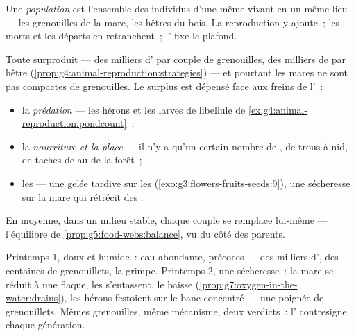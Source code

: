\begin{definition}[Population]\label{def:g8:reproduction-and-environment:population}
Une \emph{population} est l'ensemble des individus
d'une même  vivant en un même lieu --- les grenouilles de la
mare, les hêtres du bois. La reproduction y ajoute~; les morts et
les départs en retranchent~; l' fixe le plafond.
\end{definition}

\begin{proposition}\label{prop:g8:reproduction-and-environment:limits}
Toute  surproduit --- des milliers d' par couple de
grenouilles, des milliers de  par hêtre
(\cref{prop:g4:animal-reproduction:strategies}) --- et pourtant les
mares ne sont pas compactes de grenouilles. Le surplus est dépensé
face aux freins de l'~:
\begin{itemize}
  \item la \emph{prédation} --- les hérons et les larves de
        libellule de \cref{ex:g4:animal-reproduction:pondcount}~;
  \item la \emph{nourriture et la place} --- il n'y a qu'un certain
        nombre de , de trous à nid, de taches de 
        au  de la forêt~;
  \item les \emph{} --- une gelée tardive sur les 
        (\cref{exo:g3:flowers-fruits-seeds:9}), une sécheresse sur
        la mare qui rétrécit des .
\end{itemize}
En moyenne, dans un milieu stable, chaque couple se remplace
lui-même --- l'équilibre de
\cref{prop:g5:food-webs:balance}, vu du côté des parents.
\end{proposition}
\admitted

\begin{example}\label{ex:g8:reproduction-and-environment:twosprings}
Printemps 1, doux et humide~: eau abondante,  précoces ---
des milliers d', des centaines de grenouillets, la 
grimpe. Printemps 2, une sécheresse~: la mare se réduit à une
flaque, les  s'entassent, le  baisse
(\cref{prop:g7:oxygen-in-the-water:drains}), les hérons festoient
sur le banc concentré --- une poignée de grenouillets. Mêmes
grenouilles, même mécanisme, deux verdicts~: l'
contresigne chaque génération.
\end{example}

